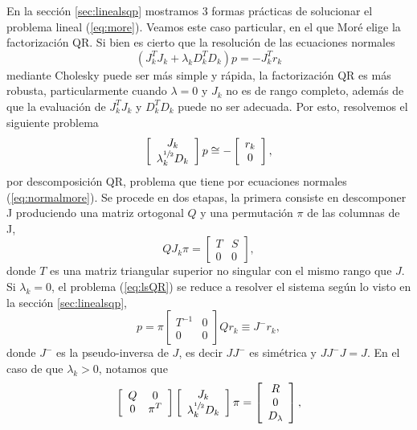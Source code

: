 \documentclass[11pt,a4paper]{book}
\theoremstyle{definition}
\theoremstyle{remark}
\begin{document}
En la sección \ref{sec:linealsqp} mostramos 3 formas prácticas de solucionar el problema lineal
(\ref{eq:more}). Veamos este caso particular, en el que
Moré elige la factorización QR. Si bien es cierto que la resolución
de las ecuaciones normales
\begin{equation}\label{eq:normalmore}
	\left(J_k^TJ_k + \lambda_k D_k^TD_k\right)p = -J_k^Tr_k
\end{equation}
mediante Cholesky puede ser más simple y rápida, la factorización QR es más robusta, particularmente
cuando $\lambda=0$ y $J_k$ no es de rango completo, además de que la evaluación de $J_k^TJ_k$ 
y $D_k^TD_k$ puede no ser adecuada. Por esto, resolvemos el siguiente problema
\begin{equation}
	\label{eq:lsQR}
	\left[ %
	\begin{array}{c}
		J_k \\
		\lambda_k^{\sfrac{1}{2}}D_k
	\end{array}
	\right]
	p \cong -\left[
	\begin{array}{c}
		r_k \\
		0
	\end{array}
	\right],
\end{equation}
por descomposición QR, problema que tiene por ecuaciones normales (\ref{eq:normalmore}).
Se procede en dos etapas, la primera consiste en descomponer J produciendo una matriz
ortogonal $Q$ y una permutación $\pi$ de las columnas de J,
\begin{equation}
	QJ_k\pi = \left[
	\begin{array}{cc}
		T & S\\
		0 & 0
	\end{array}
	\right],
\end{equation}
donde $T$ es una matriz triangular superior no singular con el mismo rango que $J$. Si
$\lambda_k=0$, el problema (\ref{eq:lsQR}) se reduce a resolver el sistema
según lo visto en la sección \ref{sec:linealsqp},
\begin{equation}
	p=\pi
	\left[
	\begin{array}{cc}
		T^{-1} & 0\\
		0 & 0
	\end{array}
	\right]
	Qr_k \equiv J^{-}r_k,
\end{equation}
donde $J^{-}$ es la pseudo-inversa de $J$, es decir $JJ^{-}$ es simétrica y $JJ^{-}J=J$.
En el caso de que $\lambda_k>0$, notamos que
\begin{equation}\label{eq:QR1}
	\left[
	\begin{array}{cc}
		Q & 0\\
		0 & \pi^T
	\end{array}
	\right]
	\left[
	\begin{array}{c}
		J_k \\
		\lambda_k^{\sfrac{1}{2}}D_k
	\end{array}
	\right]
	\pi = \left[
	\begin{array}{c}
		R \\
		0 \\
		D_\lambda
	\end{array}
	\right],
\end{equation}
\end{document}
